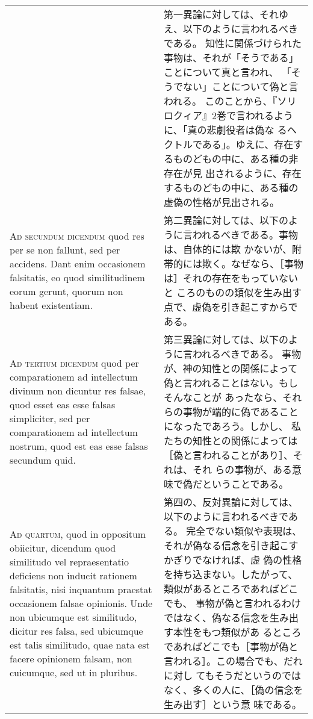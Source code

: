 \documentclass[paper=a4paper,fontsize=10pt,jafontsize=9pt,titlepage]{jlreq}
\begin{document}
\begin{longtable}{p{21em}p{21em}}
&

第一異論に対しては、それゆえ、以下のように言われるべきである。
知性に関係づけられた事物は、それが「そうである」ことについて真と言われ、
 「そうでない」ことについて偽と言われる。
このことから、『ソリロクィア』2巻で言われるように、「真の悲劇役者は偽な
 るヘクトルである」。ゆえに、存在するものどもの中に、ある種の非存在が見
 出されるように、存在するものどもの中に、ある種の虚偽の性格が見出される。

\\

{\scshape Ad secundum dicendum} quod res per se non
fallunt, sed per accidens. Dant enim occasionem falsitatis, eo quod
similitudinem eorum gerunt, quorum non habent existentiam.

&

第二異論に対しては、以下のように言われるべきである。事物は、自体的には欺
かないが、附帯的には欺く。なぜなら、［事物は］それの存在をもっていないと
ころのものの類似を生み出す点で、虚偽を引き起こすからである。




\\


{\scshape Ad tertium dicendum} quod per comparationem ad
intellectum divinum non dicuntur res falsae, quod esset eas esse falsas
simpliciter, sed per comparationem ad intellectum nostrum, quod est eas
esse falsas secundum quid.

&

第三異論に対しては、以下のように言われるべきである。
事物が、神の知性との関係によって偽と言われることはない。もしそんなことが
 あったなら、それらの事物が端的に偽であることになったであろう。しかし、
 私たちの知性との関係によっては［偽と言われることがあり］、それは、それ
 らの事物が、ある意味で偽だということである。

\\


{\scshape Ad quartum}, quod in oppositum obiicitur,
dicendum quod similitudo vel repraesentatio deficiens non inducit
rationem falsitatis, nisi inquantum praestat occasionem falsae
opinionis. Unde non ubicumque est similitudo, dicitur res falsa, sed
ubicumque est talis similitudo, quae nata est facere opinionem falsam,
non cuicumque, sed ut in pluribus.

&

第四の、反対異論に対しては、以下のように言われるべきである。
完全でない類似や表現は、それが偽なる信念を引き起こすかぎりでなければ、虚
 偽の性格を持ち込まない。したがって、類似があるところであればどこでも、
 事物が偽と言われるわけではなく、偽なる信念を生み出す本性をもつ類似があ
 るところであればどこでも［事物が偽と言われる］。この場合でも、だれに対し
 てもそうだというのではなく、多くの人に、［偽の信念を生み出す］という意
 味である。


\end{longtable}
\end{document}
